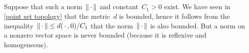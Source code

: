 \addtocounter{subsection}{2}
\subsection{}

Suppose that such a norm~$\lVert\,\cdot\,\rVert$ and constant~$C_1 > 0$ exist.
We have seen in \cref{point set topology} that the metric~$d$ is bounded, hence it follows from the inequality~$\lVert\,\cdot\,\rVert \leq d(\,\cdot\,,0)/C_1$ that the norm~$\lVert\,\cdot\,\rVert$ is also bounded.
But a norm on a nonzero vector space is never bounded (because it is reflexive and homogeneous).




